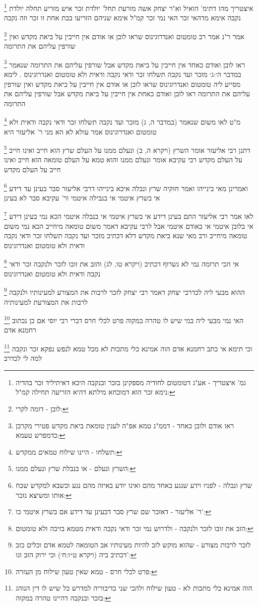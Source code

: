\documentclass[12pt, openany]{book}
\newcommand{\footnotecomment}[1]{
	\renewcommand\thefootnote{}
	\footnote{#1}}
\newcommand{\commenta}[1]{\footnotecomment{#1}}
\begin{document}
{{\commenta{גמ' איצטריך - אע"ג דטומטום לחודיה מספקינן בזכר ובנקבה היכא דאיתיליד זכר בהדיה נימא זכר הוא דמוכחא מילתא דהיא הזריעה תחילה קמ"ל:}
איצטריך מהו דתימ' הואיל וא"ר יצחק אשה מזרעת תחל' יולדת זכר איש מזריע תחלה יולדת נקבה אימא מדהאי זכר האי נמי זכר קמ"ל אימא שניהם הזריעו בבת אחת זו זכר וזה נקבה 
\commenta{לובן - דומה לקרי:}
אמר ר"נ אמר רב טומטום ואנדרוגינוס שראו לובן או אודם אין חייבין על ביאת מקדש ואין שורפין עליהם את התרומה 
\commenta{ראו אודם ולובן כאחד - דממ"נ טמא אפ"ה לענין טומאת ביאת מקדש פטירי מקרבן כדמפרש טעמא:}
ראו לובן ואודם כאחד אין חייבין על ביאת מקדש אבל שורפין עליהם את התרומה שנאמר {במדבר ה׳:ג׳ } מזכר ועד נקבה
תשלחו זכר ודאי נקבה ודאית ולא טומטום ואנדרוגינוס .
לימא מסייע ליה טומטום ואנדרוגינוס שראו לובן או אודם אין חייבין על ביאת מקדש ואין שורפין עליהם את התרומה ראו לובן ואודם כאחת אין חייבין על ביאת מקדש אבל שורפין עליהם את התרומה 
\commenta{תשלחו - היינו שילוח טמאים ממקדש:}
מ"ט לאו משום שנאמר (במדבר ה, ג) מזכר ועד נקבה תשלחו זכר ודאי נקבה ודאית ולא טומטום ואנדרוגינוס אמר עולא לא הא מני ר' אליעזר היא 
\commenta{השרץ ונעלם - או בנבלת שרץ ונעלם ממנו:}
דתנן רבי אליעזר אומר השרץ (ויקרא ה, ב) ונעלם ממנו על העלם שרץ הוא חייב ואינו חייב על העלם מקדש 
רבי עקיבא אומר ונעלם ממנו והוא טמא על העלם טומאה הוא חייב ואינו חייב על העלם מקדש 
\commenta{שרץ ונבלה - לפניו וידע שנגע באחד מהם ואינו יודע באיזה מהם נגע וכשבא למקדש שכח אותו ומשיצא נזכר:}
ואמרינן מאי בינייהו ואמר חזקיה שרץ ונבלה איכא בינייהו דרבי אליעזר סבר בעינן עד דידע אי בשרץ איטמי אי בנבילה איטמי ור' עקיבא סבר לא בעינן 
\commenta{ר' אליעזר - דאזכר שם שרץ סבר דבעינן עד דידע אם בשרץ איטמי כו':}
לאו אמר רבי אליעזר התם בעינן דידע אי בשרץ איטמי אי בנבלה איטמי הכא נמי בעינן דידע אי בלובן איטמי אי באודם איטמי 
אבל לרבי עקיבא דאמר משום טומאה מיחייב הכא נמי משום טומאה מיחייב 
ורב מאי שנא ביאת מקדש דלא דכתיב מזכר ועד נקבה תשלחו זכר ודאי נקבה ודאית ולא טומטום ואנדרוגינוס 
\commenta{הזב את זובו לזכר ולנקבה - ולדרוש נמי זכר ודאי נקבה ודאית מטמא בזיבה ולא טומטום:}
אי הכי תרומה נמי לא נשרוף דכתיב (ויקרא טו, לג) והזב את זובו לזכר ולנקבה זכר ודאי נקבה ודאית ולא טומטום ואנדרוגינוס 
\commenta{לזכר לרבות מצורע - שהוא מוקש לזב להיות מעינותיו אב הטומאה לטמא אדם וכלים כזב דכתיב ביה (ויקרא ט״ו:ח׳) וכי ירוק הזב וגו':}
ההוא מבעי ליה לכדרבי יצחק דאמר רבי יצחק לזכר לרבות את המצורע למעינותיו ולנקבה לרבות את המצורעת למעינותיה 
\commenta{פרט לכלי חרס - טמא שאין טעון שילוח מן העזרה:}
האי נמי מבעי ליה במי שיש לו טהרה במקוה פרט לכלי חרס דברי רבי יוסי 
אם כן נכתוב רחמנא אדם
\commenta{הוה אמינא כלי מתכות לא - טעון שילוח ולהכי שני בדיבוריה למדרש כל שיש לו דין הנוהג בזכר ובנקבה דהיינו טהרה במקוה:}
וכי תימא אי כתב רחמנא אדם הוה אמינא כלי מתכות לא מכל טמא לנפש נפקא זכר ונקבה למה לי לכדרב 
}}
\end{document}
